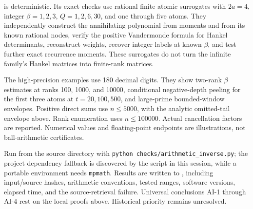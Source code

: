  is deterministic. Its exact
checks use rational finite atomic surrogates with \(2a=4\), integer
\(\beta=1,2,3\), \(Q=1,2,6,30\), and one through five atoms. They
independently construct the annihilating polynomial from moments and
from its known rational nodes, verify the positive Vandermonde formula
for Hankel determinants, reconstruct weights, recover integer labels at
known \(\beta\), and test further exact recurrence moments. These
surrogates do not turn the infinite family's Hankel matrices into
finite-rank matrices.

The high-precision examples use 180 decimal digits. They show two-rank
\(\beta\) estimates at ranks 100, 1000, and 10000, conditional
negative-depth peeling for the first three atoms at \(t=20,100,500\),
and large-prime bounded-window envelopes. Positive direct sums use
\(n\le5000\), with the analytic omitted-tail envelope above. Rank
enumeration uses \(n\le100000\). Actual cancellation factors are
reported. Numerical values and floating-point endpoints are
illustrations, not ball-arithmetic certificates.

Run from the source directory with
\texttt{\small python checks/arithmetic\_inverse.py}; the project dependency
fallback is discovered by the script in this session, while a portable
environment needs \texttt{mpmath}. Results are written to
, including
input/source hashes, arithmetic conventions, tested ranges, software
versions, elapsed time, and the source-retrieval failure. Universal
conclusions AI-1 through AI-4 rest on the local proofs above. Historical
priority remains unresolved.

